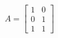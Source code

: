 \documentclass[preview]{standalone}
\begin{document}
\begin{align*}
A = \begin{bmatrix} 1 & 0 \\ 0 & 1 \\ 1 & 1 \end{bmatrix}
\end{align*}
\end{document}
